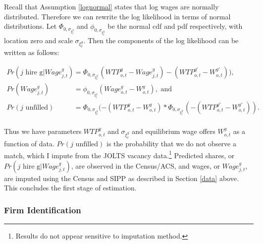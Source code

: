 \documentclass[12pt]{article}
\begin{document}
Recall that Assumption \ref{lognormal} states that log wages are normally distributed. Therefore we can rewrite the log likelihood in terms of normal distributions. Let $\Phi_{0,\sigma_{\xi^g_t}}$ and $\phi_{0,\sigma_{\xi^g_t}}$ be the normal cdf and pdf respectively, with location zero and scale $\sigma_{\xi^g_t}$. Then the components of the log likelihood can be written as follows:

\begin{align*}
Pr(\text{$j$ hire g} | Wage^g_{j,t} ) &= \Phi_{0,\sigma_{\xi^{g\prime}_t}}( WTP^g_{o,t} -  Wage^g_{j,t}) - (WTP^{g\prime}_{o,t} - W^{g\prime}_{o,t})) , \\
Pr(Wage^g_{j,t} ) &= \phi_{0,\sigma_{\xi^g_t}}( Wage^g_{o,t} - W^g_{o,t}), \text{ and}  \\
Pr( \text{$j$ unfilled}) &= \Phi_{0,\sigma_{\xi^g_t}}(-(WTP^g_{o,t} - W^g_{o,t})* \Phi_{0,\sigma_{\xi^{g\prime}_t}}(-(WTP^{g\prime}_{o,t} - W^{g\prime}_{o,t})). \\
\end{align*}



Thus we have parameters $WTP^g_{o,t}$ and $\sigma_{\xi^g_t}$ and equilibrium wage offers $W^g_{o,t}$ as a function of data. $Pr(\text{$j$ unfilled}) $ is the probability that we do not observe a match, which I impute from the JOLTS vacancy data.\footnote{Results do not appear sensitive to imputation method.} Predicted shares, or $Pr(\text{$j$ hire g} | Wage^g_{j,t} )$, are observed in the Census/ACS, and wages, or $Wage^g_{j,t}$, are imputed using the Census and SIPP as described in Section \ref{data} above. This concludes the first stage of estimation.

\subsubsection{Firm Identification}



\end{document}
